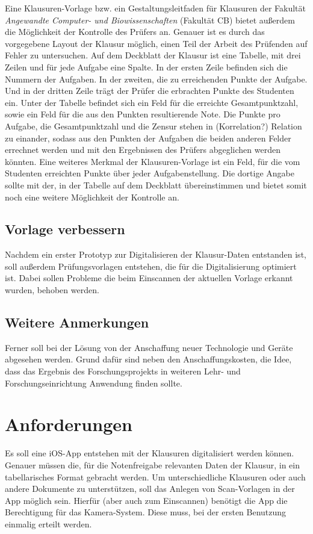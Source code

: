 \documentclass[nomenclature, oneside, 150]{HSMW-Thesis}
\begin{document}
	Eine Klausuren-Vorlage bzw. ein Gestaltungsleitfaden für Klausuren der Fakultät \textit{Angewandte Computer- und Biowissenschaften} (Fakultät CB) bietet außerdem die Möglichkeit der Kontrolle des Prüfers an. Genauer ist es durch das vorgegebene Layout der Klausur möglich, einen Teil der Arbeit des Prüfenden auf Fehler zu untersuchen. Auf dem Deckblatt der Klausur ist eine Tabelle, mit drei Zeilen und für jede Aufgabe eine Spalte. In der ersten Zeile befinden sich die Nummern der Aufgaben. In der zweiten, die zu erreichenden Punkte der Aufgabe. Und in der dritten Zeile trägt der Prüfer die erbrachten Punkte des Studenten ein. Unter der Tabelle befindet sich ein Feld für die erreichte Gesamtpunktzahl, sowie ein Feld für die aus den Punkten resultierende Note. Die Punkte pro Aufgabe, die Gesamtpunktzahl und die Zensur stehen in (Korrelation?) Relation zu einander, sodass aus den Punkten der Aufgaben die beiden anderen Felder errechnet werden und mit den Ergebnissen des Prüfers abgeglichen werden könnten. Eine weiteres Merkmal der Klausuren-Vorlage ist ein Feld, für die vom Studenten erreichten Punkte über jeder Aufgabenstellung. Die dortige Angabe sollte mit der, in der Tabelle auf dem Deckblatt übereinstimmen und bietet somit noch eine weitere Möglichkeit der Kontrolle an.
	
	\section{Vorlage verbessern}
	Nachdem ein erster Prototyp zur Digitalisieren der Klausur-Daten entstanden ist, soll außerdem Prüfungsvorlagen entstehen, die für die Digitalisierung optimiert ist. Dabei sollen Probleme die beim Einscannen der aktuellen Vorlage erkannt wurden, behoben werden. 
	
	\section{Weitere Anmerkungen}
	Ferner soll bei der Lösung von der Anschaffung neuer Technologie und Geräte abgesehen werden. Grund dafür sind neben den Anschaffungskosten, die Idee, dass das Ergebnis des Forschungsprojekts in weiteren Lehr- und Forschungseinrichtung Anwendung finden sollte.


\chapter{Anforderungen}
	Es soll eine iOS-App entstehen mit der Klausuren digitalisiert werden können. Genauer müssen die, für die Notenfreigabe relevanten Daten der Klausur, in ein tabellarisches Format gebracht werden. Um unterschiedliche Klausuren oder auch andere Dokumente zu unterstützen, soll das Anlegen von Scan-Vorlagen in der App möglich sein. Hierfür (aber auch zum Einscannen) benötigt die App die Berechtigung für das Kamera-System. Diese muss, bei der ersten Benutzung einmalig erteilt werden.
	
\end{document}
